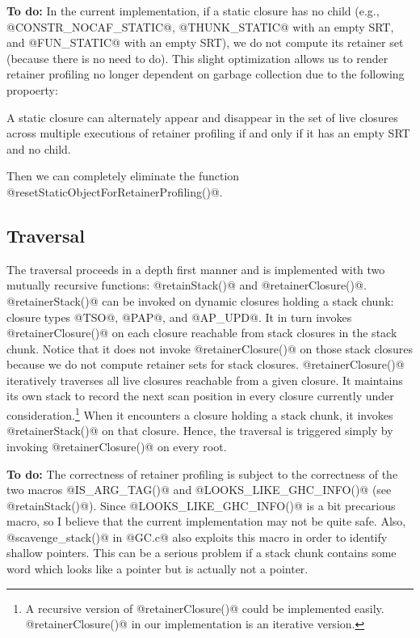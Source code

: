 \documentclass{article}
\begin{document}
\textbf{To do:} In the current implementation, if a static closure has no child
(e.g., @CONSTR_NOCAF_STATIC@, @THUNK_STATIC@ with an empty SRT, and
@FUN_STATIC@ with an empty SRT), we do not compute its retainer set (because
there is no need to do). This slight optimization allows us to render 
retainer profiling no longer dependent on garbage collection due to the
following propoerty: 

\begin{center}
A static closure can alternately appear and disappear in the set of live 
closures across multiple executions of retainer profiling if and only if
it has an empty SRT and no child.
\end{center}

Then we can completely eliminate the function 
@resetStaticObjectForRetainerProfiling()@. 

\subsection{Traversal}

The traversal proceeds in a depth first manner and is implemented
with two mutually recursive functions: @retainStack()@ and @retainerClosure()@.
@retainerStack()@ can be invoked on dynamic closures holding a stack chunk:
closure types @TSO@, @PAP@, and @AP_UPD@. 
It in turn invokes @retainerClosure()@ on each closure reachable from
stack closures in the stack chunk. Notice that it does not invoke
@retainerClosure()@ on those stack closures because we do not compute 
retainer sets for stack closures.
@retainerClosure()@ iteratively traverses all live closures reachable
from a given closure.
It maintains its own stack to record the next scan position in every closure
currently under consideration.\footnote{A recursive version of 
@retainerClosure()@ could be implemented easily. 
@retainerClosure()@ in our implementation is an iterative version.}
When it encounters a closure holding a stack chunk, it invokes @retainerStack()@
on that closure. 
Hence,
the traversal is triggered simply by invoking @retainerClosure()@ on every root.

\textbf{To do:} 
The correctness of retainer profiling is subject to the correctness
of the two macros @IS_ARG_TAG()@ and @LOOKS_LIKE_GHC_INFO()@
(see @retainStack()@). Since
@LOOKS_LIKE_GHC_INFO()@ is a bit precarious macro, so I believe that
the current implementation may not be quite safe. Also, @scavenge_stack()@
in @GC.c@ also exploits this macro in order to identify shallow pointers.
This can be a serious problem if a stack chunk contains some
word which looks like a pointer but is actually not a pointer.
\end{document}
